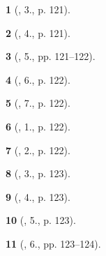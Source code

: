 \documentclass{article}
\newtheorem{baitoan}{}
\begin{document}
\begin{baitoan}[\cite{SGK_Toan_11_hinh_hoc_co_ban}, 3., p. 121]
	
\end{baitoan}

\begin{baitoan}[\cite{SGK_Toan_11_hinh_hoc_co_ban}, 4., p. 121]
	
\end{baitoan}

\begin{baitoan}[\cite{SGK_Toan_11_hinh_hoc_co_ban}, 5., pp. 121--122]
	
\end{baitoan}

\begin{baitoan}[\cite{SGK_Toan_11_hinh_hoc_co_ban}, 6., p. 122]
	
\end{baitoan}

\begin{baitoan}[\cite{SGK_Toan_11_hinh_hoc_co_ban}, 7., p. 122]
	
\end{baitoan}

\begin{baitoan}[\cite{SGK_Toan_11_hinh_hoc_co_ban}, 1., p. 122]
	
\end{baitoan}

\begin{baitoan}[\cite{SGK_Toan_11_hinh_hoc_co_ban}, 2., p. 122]
	
\end{baitoan}

\begin{baitoan}[\cite{SGK_Toan_11_hinh_hoc_co_ban}, 3., p. 123]
	
\end{baitoan}

\begin{baitoan}[\cite{SGK_Toan_11_hinh_hoc_co_ban}, 4., p. 123]
	
\end{baitoan}

\begin{baitoan}[\cite{SGK_Toan_11_hinh_hoc_co_ban}, 5., p. 123]
	
\end{baitoan}

\begin{baitoan}[\cite{SGK_Toan_11_hinh_hoc_co_ban}, 6., pp. 123--124]
	
\end{baitoan}
\end{document}
